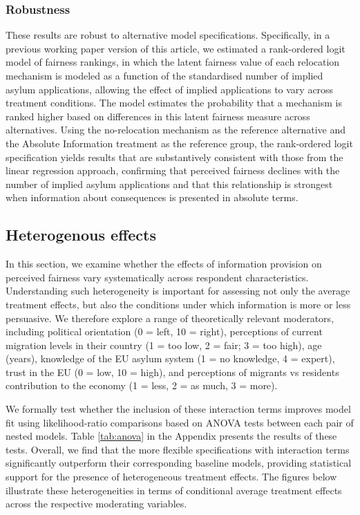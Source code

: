 \documentclass[
  12pt,
  a4paper,
]{article}
\begin{document}
\subsubsection{Robustness}\label{robustness}

These results are robust to alternative model specifications. Specifically, in a previous working paper version of this article, we estimated a rank-ordered logit model of fairness rankings, in which the latent fairness value of each relocation mechanism is modeled as a function of the standardised number of implied asylum applications, allowing the effect of implied applications to vary across treatment conditions. The model estimates the probability that a mechanism is ranked higher based on differences in this latent fairness measure across alternatives. Using the no-relocation mechanism as the reference alternative and the Absolute Information treatment as the reference group, the rank-ordered logit specification yields results that are substantively consistent with those from the linear regression approach, confirming that perceived fairness declines with the number of implied asylum applications and that this relationship is strongest when information about consequences is presented in absolute terms.

\subsection{Heterogenous effects}\label{heterogenous-effects}

In this section, we examine whether the effects of information provision on perceived fairness vary systematically across respondent characteristics. Understanding such heterogeneity is important for assessing not only the average treatment effects, but also the conditions under which information is more or less persuasive. We therefore explore a range of theoretically relevant moderators, including political orientation (0 = left, 10 = right), perceptions of current migration levels in their country (1 = too low, 2 = fair; 3 = too high), age (years), knowledge of the EU asylum system (1 = no knowledge, 4 = expert), trust in the EU (0 = low, 10 = high), and perceptions of migrants vs residents contribution to the economy (1 = less, 2 = as much, 3 = more).

We formally test whether the inclusion of these interaction terms improves model fit using likelihood-ratio comparisons based on ANOVA tests between each pair of nested models. Table \ref{tab:anova} in the Appendix presents the results of these tests. Overall, we find that the more flexible specifications with interaction terms significantly outperform their corresponding baseline models, providing statistical support for the presence of heterogeneous treatment effects. The figures below illustrate these heterogeneities in terms of conditional average treatment effects across the respective moderating variables.
\end{document}
